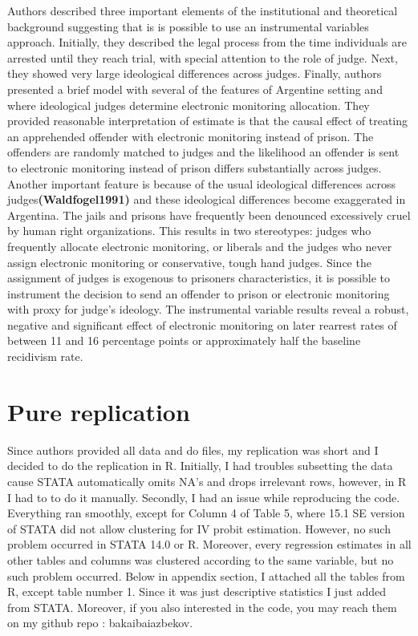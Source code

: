 \documentclass[a4paper,12pt]{article}
\begin{document}
Authors described three important elements of the institutional and theoretical background suggesting that is is possible to use an instrumental variables approach. Initially, they described the legal process from the time individuals are arrested until they reach trial, with special attention to the role of judge. Next, they showed very large ideological differences across judges. Finally, authors presented a brief model with several of the features of Argentine setting and where ideological judges determine electronic monitoring allocation.    
They provided reasonable interpretation of estimate is that the causal effect of treating an apprehended offender with electronic monitoring instead of prison. The offenders are randomly matched to judges and the likelihood an offender is sent to electronic monitoring instead of prison differs substantially across judges. Another important feature is because of the usual ideological differences across judges\textbf{(Waldfogel1991)}\cite{Waldfogel91} and these ideological differences become exaggerated in Argentina. The jails and prisons have frequently been denounced excessively cruel by human right organizations. This results in two stereotypes: judges who frequently allocate electronic monitoring, or liberals and the judges who never assign electronic monitoring or conservative, tough hand judges. Since the assignment of judges is exogenous to prisoners characteristics, it is possible to instrument the decision to send an offender to prison or electronic monitoring with proxy for judge's ideology. The instrumental variable results reveal a robust, negative and significant effect of electronic monitoring on later rearrest rates of between 11 and 16 percentage points or approximately half the baseline recidivism rate.   




\newpage
\section{Pure replication}
Since authors provided all data and do files, my replication was short and I decided to do the replication in R. Initially, I had troubles subsetting the data cause STATA automatically omits NA's and drops irrelevant rows, however, in R I had to to do it manually. Secondly, I had an issue while  reproducing the code. Everything ran smoothly, except for Column 4 of Table 5, where 15.1 SE version of STATA did not allow clustering for IV probit estimation. However, no such problem occurred in STATA 14.0 or R. Moreover, every regression estimates in all other tables and columns was clustered according to the same variable, but no such problem occurred. Below in appendix section, I attached all the tables  from R, except table number 1. Since it was just descriptive statistics I just added from STATA. Moreover, if you also interested in the code, you may reach them on my github repo : bakaibaiazbekov. 
\end{document}
